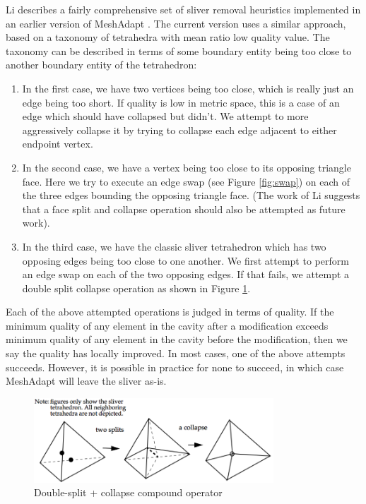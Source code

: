 Li describes a fairly comprehensive set of sliver removal
heuristics implemented in an earlier version of MeshAdapt
\cite{li2003mesh}.
The current version uses a similar approach, based on a
taxonomy of tetrahedra with mean ratio low quality value.
The taxonomy can be described in terms of some boundary
entity being too close to another boundary entity
of the tetrahedron:
\begin{enumerate}
\item In the first case, we have two vertices being too
close, which is really just an edge being too short.
If quality is low in metric space, this is a case
of an edge which should have collapsed but didn't.
We attempt to more aggressively collapse it by trying
to collapse each edge adjacent to either endpoint vertex.
\item In the second case, we have a vertex being too close
to its opposing triangle face.
Here we try to execute an edge swap (see Figure \ref{fig:swap})
on each of the three edges bounding the opposing triangle face.
(The work of Li suggests that a face split and collapse operation
should also be attempted as future work).
\item In the third case, we have the classic sliver tetrahedron
which has two opposing edges being too close to one another.
We first attempt to perform an edge swap on each of the two
opposing edges.
If that fails, we attempt a double split collapse operation
as shown in Figure \ref{fig:compound}.
\end{enumerate}
Each of the above attempted operations is judged in terms of quality.
If the minimum quality of any element in the cavity after a modification
exceeds minimum quality of any element in the cavity before the
modification, then we say the quality has locally improved.
In most cases, one of the above attempts succeeds.
However, it is possible in practice for none to succeed, in which
case MeshAdapt will leave the sliver as-is.

\begin{figure}
\begin{center}
\includegraphics[width=0.8\textwidth]{split_collapse.png}
\caption{Double-split + collapse compound operator
\cite{li2003mesh}}
\label{fig:compound}
\end{center}
\end{figure}

